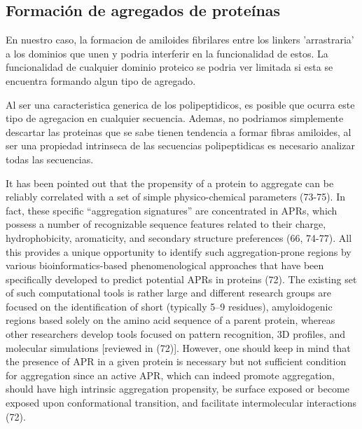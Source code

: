 \subsection{Formación de agregados de proteínas}


En nuestro caso, la formacion de amiloides fibrilares entre los linkers 'arrastraria' a los dominios que unen y podria interferir en la funcionalidad de estos. 
La funcionalidad de cualquier dominio proteico se podria ver limitada si esta se encuentra formando algun tipo de agregado.

Al ser una caracteristica generica de los polipeptidicos, es posible que ocurra este tipo de agregacion en cualquier secuencia. 
Ademas, no podriamos simplemente descartar las proteinas que se sabe tienen tendencia a formar fibras amiloides, al ser una propiedad intrinseca de las secuencias polipeptidicas es necesario analizar todas las secuencias.







It has been pointed out that the propensity of a protein to aggregate can be reliably correlated with a set of simple
physico-chemical parameters (73-75). In fact, these specific “aggregation signatures” are concentrated in APRs, which possess a
number of recognizable sequence features related to their charge, hydrophobicity, aromaticity, and secondary structure
preferences (66, 74-77). All this provides a unique opportunity to identify such aggregation-prone regions by various
bioinformatics-based phenomenological approaches that have been specifically developed to predict potential APRs in proteins
(72). The existing set of such computational tools is rather large and different research groups are focused on the identification of
short (typically 5–9 residues), amyloidogenic regions based solely on the amino acid sequence of a parent protein, whereas other
researchers develop tools focused on pattern recognition, 3D profiles, and molecular simulations [reviewed in (72)]. However,
one should keep in mind that the presence of APR in a given protein is necessary but not sufficient condition for aggregation
since an active APR, which can indeed promote aggregation, should have high intrinsic aggregation propensity, be surface
exposed or become exposed upon conformational transition, and facilitate intermolecular interactions (72).


